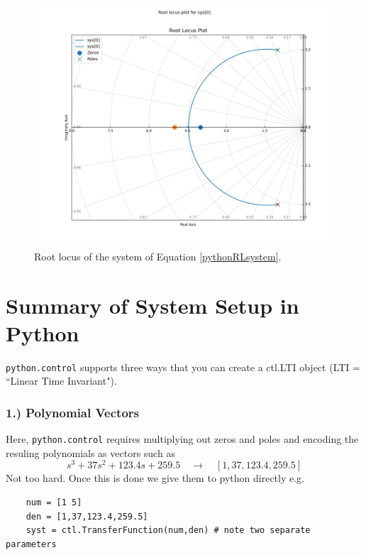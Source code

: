 \begin{figure}[b]
    \includegraphics[width=\textwidth]{figs08/B31H79.png}
    \caption{Root locus of the system of Equation \ref{pythonRLsystem}.}\label{pythonRLoutput}
\end{figure}

\clearpage
\section{Summary of System Setup in Python}
{\tt python.control} supports three ways that you can create a ctl.LTI object (LTI = ``Linear Time Invariant").

\subsubsection{1.) Polynomial Vectors}
Here, {\tt python.control} requires multiplying out zeros and  poles and encoding
the resuling polynomials as vectors such as
\[
s^3 + 37s^2 + 123.4s + 259.5 \quad \to \quad [1, 37, 123.4, 259.5]
\]
Not too hard.  Once this is done we give them to python directly e.g.

\begin{verbatim}
    num = [1 5]
    den = [1,37,123.4,259.5]
    syst = ctl.TransferFunction(num,den) # note two separate parameters
\end{verbatim}

